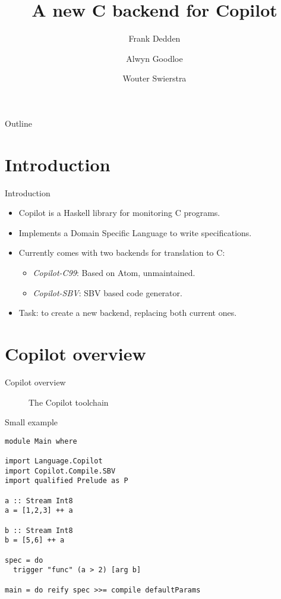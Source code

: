 \documentclass{beamer}
\title{A new C backend for Copilot}
\author{Frank Dedden\inst{1,2} \and Alwyn Goodloe\inst{3} \and Wouter Swierstra\inst{1}}
\institute
{
  \inst{1}
  Utrecht University\\
  Department of Information and Computing Sciences\\
  \emph{Utrecht, The Netherlands}
  \and
  \inst{2}
  National Institute of Aerospace\\
  \emph{Hampton, Virginia, United States of America}
  \and
  \inst{3}
  NASA Langley Research Center\\
  Safety Critical Avionics Systems Branch\\
  \emph{Hampton, Virginia, United States of America}
}
\begin{document}
\begin{frame}
  \titlepage
\end{frame}

\begin{frame}{Outline}
  \tableofcontents
\end{frame}



\section{Introduction}
\begin{frame}{Introduction}
\begin{itemize}
  \item Copilot is a Haskell library for monitoring C programs.
  \item Implements a Domain Specific Language to write specifications.
  \item Currently comes with two backends for translation to C:
  \begin{itemize}
    \item \emph{Copilot-C99}: Based on Atom, unmaintained.
    \item \emph{Copilot-SBV}: SBV based code generator.
  \end{itemize}
  \item Task: to create a new backend, replacing both current ones.
\end{itemize}
\end{frame}


\section{Copilot overview}
\begin{frame}{Copilot overview}
\begin{figure}[ht!]
  \centering
  
  \caption{The Copilot toolchain}
  \label{fig:copilot_toolchain}
\end{figure}
\end{frame}

\begin{frame}[fragile]{Small example}
\begin{lstlisting}
module Main where

import Language.Copilot
import Copilot.Compile.SBV
import qualified Prelude as P

a :: Stream Int8
a = [1,2,3] ++ a

b :: Stream Int8
b = [5,6] ++ a

spec = do
  trigger "func" (a > 2) [arg b]

main = do reify spec >>= compile defaultParams
\end{lstlisting}
\end{frame}
\end{document}
